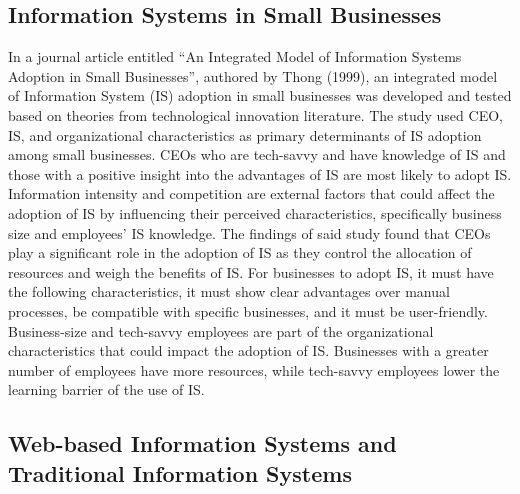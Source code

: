\documentclass[journal]{./IEEE/IEEEtran}
\begin{document}
\subsection{\textbf{Information Systems in Small Businesses}
}
In a journal article entitled “An Integrated Model of Information Systems Adoption in Small Businesses”, authored by Thong (1999), an integrated model of Information System (IS) adoption in small businesses was developed and tested based on theories from technological innovation literature. The study used CEO, IS, and organizational characteristics as primary determinants of IS adoption among small businesses. CEOs who are tech-savvy and have knowledge of IS and those with a positive insight into the advantages of IS are most likely to adopt IS. Information intensity and competition are external factors that could affect the adoption of IS by influencing their perceived characteristics, specifically business size and employees’ IS knowledge. The findings of said study found that CEOs play a significant role in the adoption of IS as they control the allocation of resources and weigh the benefits of IS. For businesses to adopt IS, it must have the following characteristics, it must show clear advantages over manual processes, be compatible with specific businesses, and it must be user-friendly. Business-size and tech-savvy employees are part of the organizational characteristics that could impact the adoption of IS. Businesses with a greater number of employees have more resources, while tech-savvy employees lower the learning barrier of the use of IS.

\subsection{\textbf{Web-based Information Systems and Traditional Information Systems}}
\end{document}
